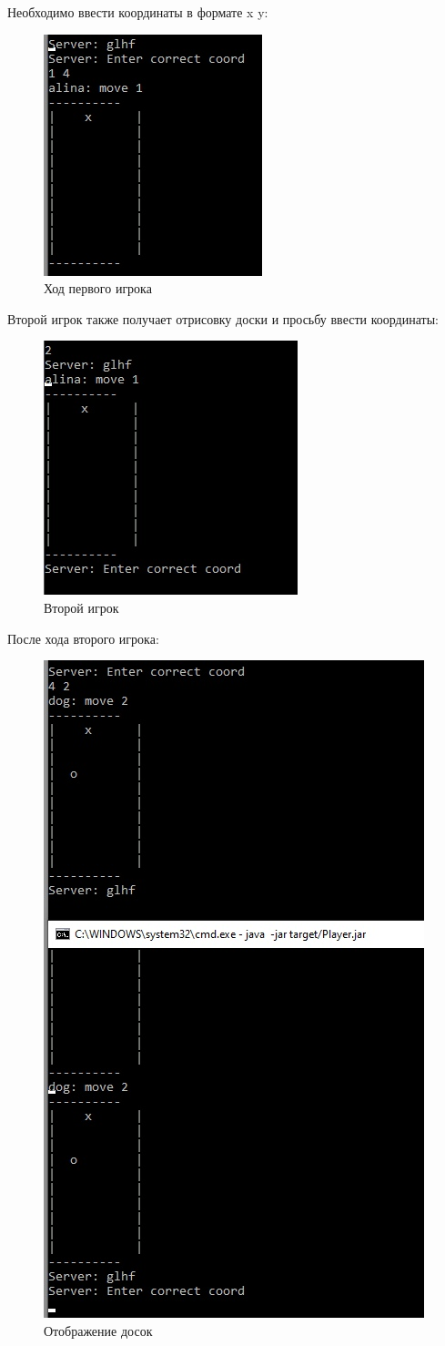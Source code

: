 \documentclass[a4paper,14pt]{extarticle} %
\begin{document}
\newpage
Необходимо ввести координаты в формате x y:
\begin{figure}[h]
\centering
\includegraphics[width=0.4\linewidth]{MOVEXC10.jpg}
\caption{Ход первого игрока}
\label{fig:mpr}
\end{figure}

Второй игрок также получает отрисовку доски и просьбу ввести координаты:
\begin{figure}[h]
	\centering
	\includegraphics[width=0.4\linewidth]{SECOND11.jpg}
	\caption{Второй игрок}
	\label{fig:mpr}
\end{figure}

\newpage
После хода второго игрока:
\begin{figure}[h]
	\centering
	\includegraphics[width=0.5\linewidth]{MOVES12.jpg}
	\caption{Отображение досок}
	\label{fig:mpr}
\end{figure}
\end{document}

